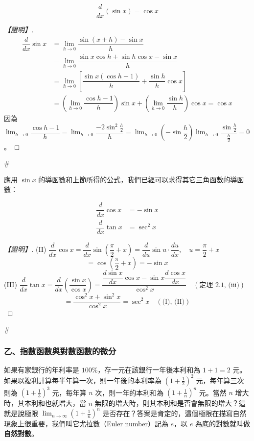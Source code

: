 \begin{theorem}\label{thm:b6-app4-deriv-sin}
\[ \dfrac{d}{dx}(\sin x) = \cos x \tag{I} \]
\end{theorem}

\begin{proof}[【證明】]
\begin{align*}
\dfrac{d}{dx}\sin x &= \lim_{h\to 0}\dfrac{\sin(x+h)-\sin x}{h} \\
&= \lim_{h\to 0}\dfrac{\sin x\cos h + \sin h\cos x - \sin x}{h} \\
&= \lim_{h\to 0}\left[\dfrac{\sin x(\cos h - 1)}{h} + \dfrac{\sin h}{h}\cos x\right] \\
&= \left(\lim_{h\to 0}\dfrac{\cos h - 1}{h}\right)\sin x + \left(\lim_{h\to 0}\dfrac{\sin h}{h}\right)\cos x = \cos x
\end{align*}
因為 $\lim_{h\to 0}\dfrac{\cos h - 1}{h} = \lim_{h\to 0}\dfrac{-2\sin^2\frac{h}{2}}{h} = \lim_{h\to 0}\left(-\sin\dfrac{h}{2}\right)\lim_{h\to 0}\dfrac{\sin\frac{h}{2}}{\frac{h}{2}} = 0$。
\end{proof}\hfill$\#$

應用 $\sin x$ 的導函數和上節所得的公式，我們已經可以求得其它三角函數的導函數：

\begin{theorem}\label{thm:b6-app4-deriv-trig-other}
\begin{align*}
\dfrac{d}{dx}\cos x &= -\sin x \tag{II} \\
\dfrac{d}{dx}\tan x &= \sec^2 x \tag{III}
\end{align*}
\end{theorem}

\begin{proof}[【證明】]
(II) $\dfrac{d}{dx}\cos x = \dfrac{d}{dx}\sin\left(\dfrac{\pi}{2}+x\right) = \dfrac{d}{du}\sin u\cdot\dfrac{du}{dx}, \quad u=\dfrac{\pi}{2}+x$
\[ = \cos\left(\dfrac{\pi}{2}+x\right) = -\sin x \]
(III) $\dfrac{d}{dx}\tan x = \dfrac{d}{dx}\left(\dfrac{\sin x}{\cos x}\right) = \dfrac{\dfrac{d\sin x}{dx}\cos x - \sin x\dfrac{d\cos x}{dx}}{\cos^2 x} \quad (\text{定理 2.1, (iii)})$
\[ = \dfrac{\cos^2 x + \sin^2 x}{\cos^2 x} = \sec^2 x \quad (\text{(I), (II)}) \]
\end{proof}\hfill$\#$

\subsubsection*{乙、指數函數與對數函數的微分}

如果有家銀行的年利率是 $100\%$，存一元在該銀行一年後本利和為 $1+1=2$ 元。如果以複利計算每半年算一次，則一年後的本利率為 $\left(1+\frac{1}{2}\right)^2$ 元，每年算三次則為 $\left(1+\frac{1}{3}\right)^3$ 元，每年算 $n$ 次，則一年的本利和為 $\left(1+\frac{1}{n}\right)^n$ 元。當然 $n$ 增大時，其本利和也就增大，當 $n$ 無限的增大時，則其本利和是否會無限的增大？這就是說極限 $\lim_{n\to\infty}\left(1+\frac{1}{n}\right)^n$ 是否存在？答案是肯定的，這個極限在描寫自然現象上很重要，我們叫它尤拉數（Euler number）記為 $e$，以 $e$ 為底的對數就叫做\textbf{自然對數}。

